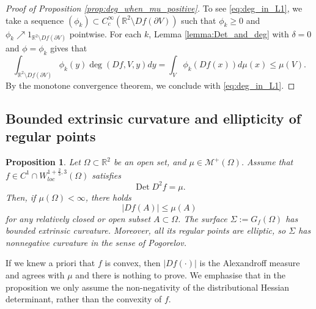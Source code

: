 \documentclass[12pt]{article}
\newcommand{\R}{\mathbb{R}}
\newcommand{\Det}{\operatorname{Det}}
\theoremstyle{plain}
\newtheorem{proposition}[theorem]{Proposition}
\numberwithin{equation}{section}
\begin{document}
\begin{proof}[Proof of Proposition \ref{prop:deg_when_mu_positive}]
     To see \eqref{eq:deg_in_L1}, we take a sequence $(\phi_k) \subset C^\infty_c(\R^2 \setminus Df(\partial V))$ such that $\phi_k \geq 0$ and $\phi_k \nearrow 1_{\R^2 \setminus Df(\partial V)}$ pointwise. For each $k$, Lemma \ref{lemma:Det_and_deg} with $\delta = 0$ and $\phi = \phi_k$ gives that
    \begin{equation*}
        \int_{\R^2 \setminus Df(\partial V)} \phi_k(y) \deg(Df, V,y) dy = \int_V \phi_k(Df(x)) d\mu(x) \leq \mu(V).
    \end{equation*}
    By the monotone convergence theorem, we conclude with \eqref{eq:deg_in_L1}.
\end{proof}

\subsection{Bounded extrinsic curvature and ellipticity of regular points} \label{sec:graphical_surf_is_BEC}

\begin{proposition} \label{prop:graph_bec}
    Let $\Omega \subset \R^2$ be an open set, and $\mu \in \mathcal{M}^+(\Omega)$. Assume that $f \in C^1 \cap W^{1+\frac23,3}_{loc}(\Omega)$ satisfies 
    \begin{equation*}
        \Det D^2 f = \mu.
    \end{equation*}
    Then, if $\mu(\Omega) < \infty$, there holds
    \begin{equation} \label{eq:alex_leq_mu_closed}
        |Df(A)| \leq \mu(A)
    \end{equation}
    for any relatively closed or open subset $A \subset \Omega$. The surface $\Sigma:= G_f(\Omega)$ has bounded extrinsic curvature. Moreover, all its regular points are elliptic, so $\Sigma$ has nonnegative curvature in the sense of Pogorelov.
\end{proposition}

If we knew a priori that $f$ is convex, then $|Df(\cdot)|$ is the Alexandroff measure and agrees with $\mu$ and there is nothing to prove. We emphasise that in the proposition we only assume the non-negativity of the distributional Hessian determinant, rather than the convexity of $f$.
\end{document}
